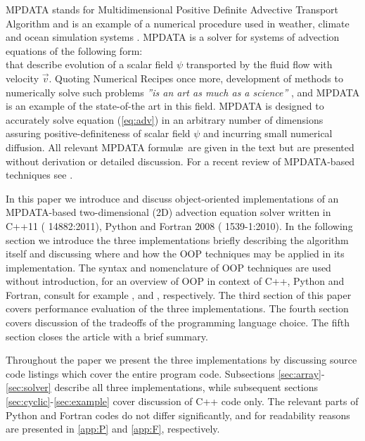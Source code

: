 \documentclass[final,5p,times,twocolumn]{elsarticle}
\begin{document}
  MPDATA \citep{Smolarkiewicz_1984} stands for Multidimensional Positive Definite Advective Transport Algorithm and is
    an example of a numerical procedure used in weather, climate and ocean simulation systems
    \citep[e.g.][respectively]{Ziemianski_et_al_2011,Abiodun_et_al_2011,Ezer_et_al_2002}.
  MPDATA is a solver for systems of advection equations of the following form:
  \begin{equation}\label{eq:adv}
    
  \end{equation}
  that describe evolution of a scalar field $\psi$ transported by the fluid flow with velocity $\vec{v}$.
  Quoting Numerical Recipes once more, development of methods to numerically solve such problems 
    {\em ''is an art as much as a science''} \citep[][Sec.~20.1]{Press_et_al_2007},
    and MPDATA is an example of the state-of-the art in this field.
  MPDATA is designed to accurately solve equation (\ref{eq:adv}) in an arbitrary
    number of dimensions assuring positive-definiteness of scalar field $\psi$ 
    and incurring small numerical diffusion.
  All relevant MPDATA formul\ae~are given in the text but are presented without
    derivation or detailed discussion.
  For a recent review of MPDATA-based techniques see \citet[][and references therein]{Smolarkiewicz_2006}.

  In this paper we introduce and discuss object-oriented implementations of an MPDATA-based 
    two-dimensional (2D) advection equation solver written in C++11 (\citeauthor{ISO_14882} 14882:2011), 
    Python \citep{Rossum_and_Drake_2011} and Fortran 2008 (\citeauthor{ISO_1539-1} 1539-1:2010). 
  In the following section we introduce the three implementations
    briefly describing the algorithm itself and
    discussing where and how the OOP techniques may be applied in its implementation.
  The syntax and nomenclature of OOP techniques are used without introduction,
    for an overview of OOP in context of C++, Python and Fortran, consult for example
    \citep[][Part~II]{Stroustrup_2000}, \citep[][Chapter~5]{Pilgrim_2004} and
    \citep[][Chapter~11]{Markus_2012}, respectively.
  The third section of this paper covers performance evaluation of the three implementations.
  The fourth section covers discussion of the tradeoffs of the programming language choice.
  The fifth section closes the article with a brief summary.

  Throughout the paper we present the three implementations by discussing 
    source code listings which cover the entire program code.
  Subsections \ref{sec:array}-\ref{sec:solver} describe all three implementations,
    while subsequent sections \ref{sec:cyclic}-\ref{sec:example} cover discussion of C++ code 
    only.
  The relevant parts of Python and Fortran codes do not differ significantly, and for readability reasons 
    are presented in \ref{app:P} and \ref{app:F}, respectively.
\end{document}
